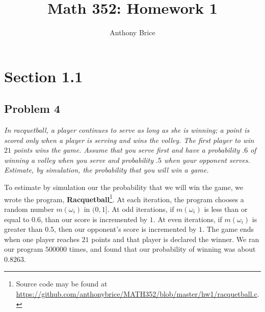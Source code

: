 \documentclass{tufte-handout}
\title{Math 352: Homework 1}
\author{Anthony Brice}
\begin{document}
\maketitle
\section{Section 1.1}
\subsection{Problem 4}
\begin{description}
\item \textit{In racquetball, a player continues to serve as long as
    she is winning; a point is scored only when a player is serving
    and wins the volley. The first player to win $21$ points wins the
    game. Assume that you serve first and have a probability $.6$ of
    winning a volley when you serve and probability $.5$ when your
    opponent serves. Estimate, by simulation, the probability that you
    will win a game.}
\end{description}  

To estimate by simulation our the probability that we will win the
game, we wrote the program, \textbf{Racquetball}\footnote{Source code
  may be found at
  \url{https://github.com/anthonybrice/MATH352/blob/master/hw1/racquetball.c}.}. At
each iteration, the program chooses a random number $m(\omega_i)$ in $(0,1]$. At odd iterations, if $m(\omega_i)$ is less than or equal to
$0.6$, than our score is incremented by $1$. At even iterations, if
$m(\omega_i)$ is greater than $0.5$, then our opponent's score is
incremented by $1$. The game ends when one player reaches $21$ points and
that player is declared the winner. We ran our program $500000$ times,
and found that our probability of winning was about $0.8263$.
\end{document}
